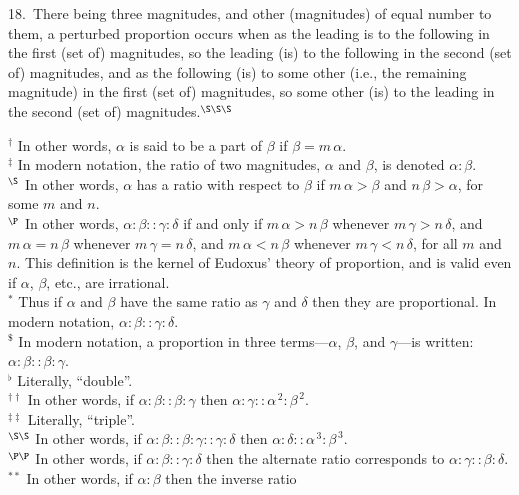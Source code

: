 \begin{Parallel}{}{}
{18.~There being three magnitudes,
  and  other (magnitudes)
 of equal  number to them,  a  perturbed proportion occurs  when  as 
 the  leading is to the following
 in the first (set of) magnitudes, so the  leading (is) to the following  in the second (set of) magnitudes, and as   the following (is) to
 some other ({\rm i.e.}, the remaining magnitude) in the first (set of) magnitudes, so some other (is)  to the leading  in the second (set of) magnitudes.$^{\S\S\S}$}
\end{Parallel}
{\footnotesize \noindent$^\dag$ In other words, $\alpha$ is said to be a part of $\beta$ if $\beta = m\,\alpha$.\\[0.5ex]
$^\ddag$ In modern notation, the ratio of two 
magnitudes, $\alpha$ and $\beta$, is denoted $\alpha:\beta$.\\[0.5ex]
$^\S$ In other words, $\alpha$ has a ratio with respect to $\beta$ if $m\,\alpha >\beta$
and $n\,\beta>\alpha$, for some $m$ and $n$.\\[0.5ex]
$^\P$ In other words, $\alpha:\beta::\gamma:\delta$ if and only if $m\,\alpha>n\,\beta$ whenever $m\,\gamma>n\,\delta$, and $m\,\alpha=n\,\beta$
whenever $m\,\gamma=n\,\delta$, and $m\,\alpha< n\,\beta$ whenever $m\,\gamma<
n\,\delta$, for all $m$ and $n$. This definition  is the kernel of Eudoxus' theory of proportion, and is valid even if $\alpha$,  $\beta$, {\rm etc.}, are irrational.\\[0.5ex]
$^\ast$ Thus if $\alpha$ and $\beta$ have the same ratio
as $\gamma$ and $\delta$ then they are proportional. In modern notation,
$\alpha:\beta::\gamma:\delta$.\\[0.5ex]
$^{\$}$ In modern notation, a proportion in three terms---$\alpha$, $\beta$, and $\gamma$---is written: $\alpha:\beta::\beta:\gamma$.\\
$^{\flat}$ Literally, ``double''.\\[0.5ex]
$^{\dag\dag}$ In other words, if $\alpha:\beta::\beta:\gamma$ then $\alpha:\gamma::\alpha^{\,2}:\beta^{\,2}$.\\[0.5ex]
$^{\ddag\ddag}$ Literally, ``triple''.\\[0.5ex]
$^{\S\S}$ In other words, if $\alpha:\beta::\beta:\gamma::\gamma:\delta$ then $\alpha:\delta::\alpha^{\,3}:\beta^{\,3}$.\\[0.5ex]
$^{\P\P}$ In other words, if $\alpha:\beta::\gamma:\delta$ then the alternate ratio
corresponds to  $\alpha:\gamma::\beta:\delta$.\\[0.5ex]
$^{\ast\ast}$ In other words, if  $\alpha:\beta$ then the inverse ratio
}
